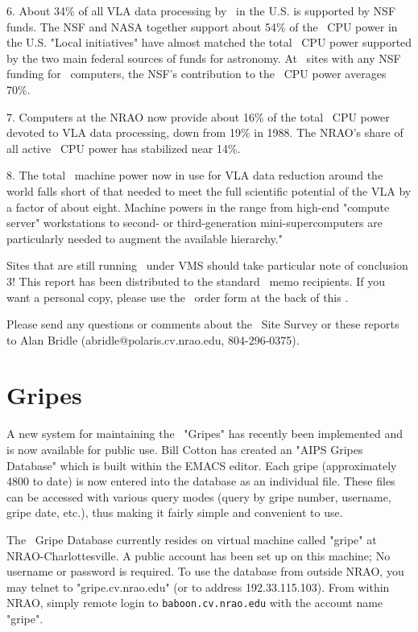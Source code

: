 6.  About 34\% of all VLA data processing by \AIPS\  in the U.S.  is
supported by NSF funds.  The NSF and NASA together support about 54\% of
the \AIPS\  CPU power in the U.S.  "Local initiatives" have almost matched
the total \AIPS\  CPU power supported by the two main federal sources of
funds for astronomy.  At \AIPS\  sites with any NSF funding for \AIPS\
computers, the NSF's contribution to the \AIPS\  CPU power averages 70\%.

7.  Computers at the NRAO now provide about 16\% of the total \AIPS\  CPU
power devoted to VLA data processing, down from 19\% in 1988.  The NRAO's
share of all active \AIPS\  CPU power has stabilized near 14\%.

8.  The total \AIPS\  machine power now in use for VLA data reduction
around the world falls short of that needed to meet the full scientific
potential of the VLA by a factor of about eight.  Machine powers in the
range from high-end "compute server" workstations to second- or
third-generation mini-supercomputers are particularly needed to augment
the available hierarchy."

Sites that are still running \AIPS\  under VMS should take particular note
of conclusion 3! This report has been distributed to the standard \AIPS\
memo recipients.  If you want a personal copy, please use the \AIPS\  order
form at the back of this \Aipsletter.

Please send any questions or comments about the \AIPS\  Site Survey or
these reports to Alan Bridle (abridle@polaris.cv.nrao.edu, 804-296-0375).

\section{Gripes}

A new system for maintaining the \AIPS\ "Gripes" has recently been
implemented and is now available for public use. Bill Cotton has created an
"AIPS Gripes Database" which is built within the EMACS editor. Each gripe
(approximately 4800 to date) is now entered into the database as an individual
file. These files can be accessed with various query modes (query by gripe
number, username, gripe date, etc.), thus making it fairly simple and
convenient to use.

The \AIPS\ Gripe Database currently resides on virtual machine called "gripe"
at NRAO-Charlottesville. A public account has been set up on this
machine; No username or password is required. To use the database from outside
NRAO, you may telnet to "gripe.cv.nrao.edu" (or to address 192.33.115.103).
From within NRAO, simply remote login to {\tt baboon.cv.nrao.edu}
with the account name "gripe".

